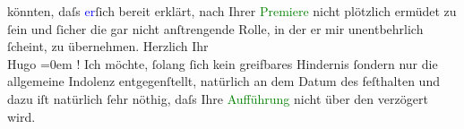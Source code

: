                     könnten, daſs {\pb}\textcolor{blue}{er}{}ſich bereit erklärt,
                    nach Ihrer \textcolor{green}{Premiere}{} nicht
                    plötzlich ermüdet zu ſein und ſicher die gar nicht anſtrengende Rolle, in der er
                    mir unentbehrlich ſcheint, zu übernehmen.\pend
           \pstart
           Herzlich Ihr{\\[\baselineskip]}\spacefill\mbox{Hugo}\pend
           \leftskip=0em{}\pstart
           \label{K_L00891_1v}\label{K_L00891_1h}!\pend
           \pstart
           {\pb}Ich möchte, ſolang ſich
                        kein greifbares Hindernis ſondern nur die allgemeine Indolenz
                        entgegenſtellt, natürlich an dem Datum des \label{K_L00891_2v}\label{K_L00891_2h} feſthalten und dazu iſt
                        natürlich ſehr nöthig, daſs Ihre \textcolor{green}{Aufführung}{} nicht über den \label{K_L00891_3v}\label{K_L00891_3h} verzögert wird.\pend
           \endnumbering{}  
      
